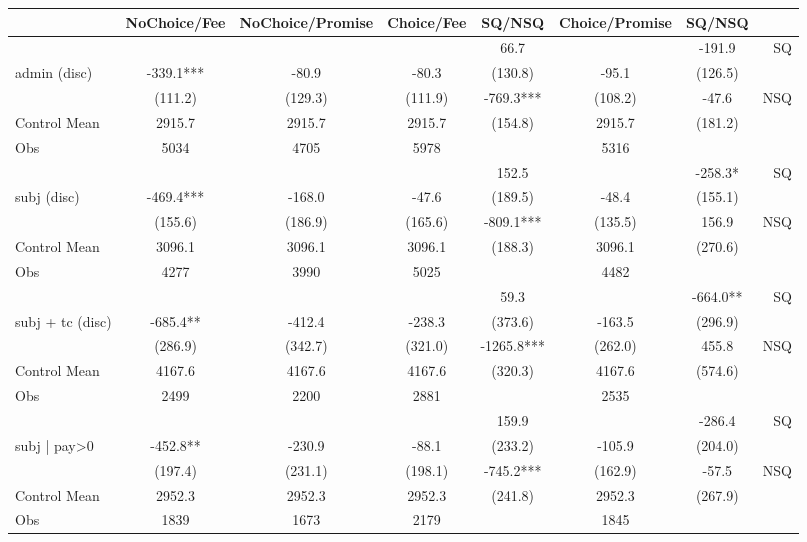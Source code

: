 \begin{tabular}{lccccccr}
\toprule
      & NoChoice/Fee & NoChoice/Promise & Choice/Fee & SQ/NSQ & Choice/Promise & SQ/NSQ &  \\
\midrule
\midrule
      &       &       &       & 66.7  &       & -191.9 & SQ \\
admin (disc) & -339.1*** & -80.9 & -80.3 & (130.8) & -95.1 & (126.5) &  \\
\cmidrule{5-5}\cmidrule{7-8}      & (111.2) & (129.3) & (111.9) & -769.3*** & (108.2) & -47.6 & NSQ \\
Control Mean & 2915.7 & 2915.7 & 2915.7 & (154.8) & 2915.7 & (181.2) &  \\
Obs   & 5034  & 4705  & 5978  &       & 5316  &       &  \\
\midrule
\midrule
      &       &       &       & 152.5 &       & -258.3* & SQ \\
subj (disc) & -469.4*** & -168.0 & -47.6 & (189.5) & -48.4 & (155.1) &  \\
\cmidrule{5-5}\cmidrule{7-8}      & (155.6) & (186.9) & (165.6) & -809.1*** & (135.5) & 156.9 & NSQ \\
Control Mean & 3096.1 & 3096.1 & 3096.1 & (188.3) & 3096.1 & (270.6) &  \\
Obs   & 4277  & 3990  & 5025  &       & 4482  &       &  \\
\midrule
\midrule
      &       &       &       & 59.3  &       & -664.0** & SQ \\
subj + tc (disc) & -685.4** & -412.4 & -238.3 & (373.6) & -163.5 & (296.9) &  \\
\cmidrule{5-5}\cmidrule{7-8}      & (286.9) & (342.7) & (321.0) & -1265.8*** & (262.0) & 455.8 & NSQ \\
Control Mean & 4167.6 & 4167.6 & 4167.6 & (320.3) & 4167.6 & (574.6) &  \\
Obs   & 2499  & 2200  & 2881  &       & 2535  &       &  \\
\midrule
\midrule
      &       &       &       & 159.9 &       & -286.4 & SQ \\
subj | pay>0 & -452.8** & -230.9 & -88.1 & (233.2) & -105.9 & (204.0) &  \\
\cmidrule{5-5}\cmidrule{7-8}      & (197.4) & (231.1) & (198.1) & -745.2*** & (162.9) & -57.5 & NSQ \\
Control Mean & 2952.3 & 2952.3 & 2952.3 & (241.8) & 2952.3 & (267.9) &  \\
Obs   & 1839  & 1673  & 2179  &       & 1845  &       &  \\

\end{tabular}

